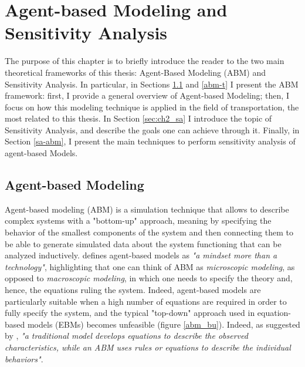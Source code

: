 \chapter{Agent-based Modeling and Sensitivity Analysis} \label{ch:literature}

The purpose of this chapter is to briefly introduce the reader to the two main theoretical frameworks of this thesis: Agent-Based Modeling (ABM) and Sensitivity Analysis. In particular, in Sections \ref{abm} and \ref{abm-t} I present the ABM framework: first, I provide a general overview of Agent-based Modeling; then, I focus on how this modeling technique is applied in the field of transportation, the most related to this thesis. In Section \ref{sec:ch2_sa} I introduce the topic of Sensitivity Analysis, and describe the goals one can achieve through it. Finally, in Section \ref{sa-abm}, I present the main techniques to perform sensitivity analysis of agent-based Models.  


\section{Agent-based Modeling}\label{abm}

Agent-based modeling (ABM) is a simulation technique that allows to describe complex systems with a "bottom-up" approach, meaning by specifying the behavior of the smallest components of the system and then connecting them to be able to generate simulated data about the system functioning that can be analyzed inductively. \textcite{bonabeau2002} defines agent-based models as \textit{"a mindset more than a technology"}, highlighting that one can think of ABM as \textit{microscopic modeling}, as opposed to \textit{macroscopic modeling}, in which one needs to specify the theory and, hence, the equations ruling the system. Indeed, agent-based models are particularly suitable when a high number of equations are required in order to fully specify the system, and the typical "top-down" approach used in equation-based models (EBMs) becomes unfeasible (figure \ref{abm_bu}). Indeed, as suggested by \textcite{Walton2007ArtificialII}, \textit{"a traditional model develops equations to describe the observed characteristics, while an ABM uses rules or equations to describe the individual behaviors"}. \\

